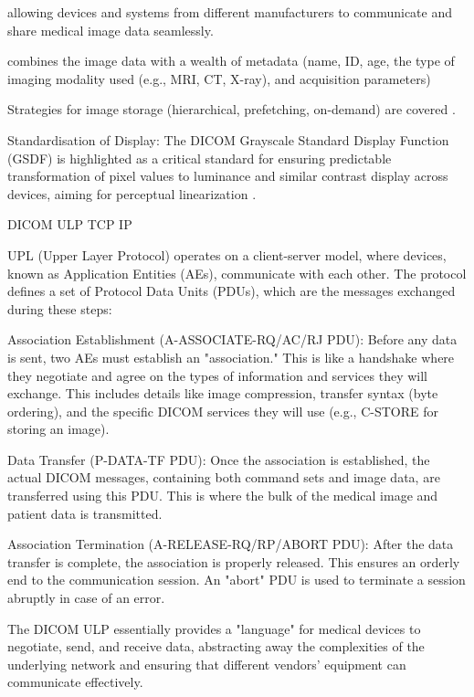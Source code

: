 allowing devices and systems from different manufacturers to communicate and share medical image data seamlessly.

combines the image data with a wealth of metadata (name, ID, age, the type of imaging modality used (e.g., MRI, CT, X-ray), and acquisition parameters)

Strategies for image storage (hierarchical, prefetching, on-demand)
are covered \cite{bushberg2011essential}.

Standardisation of Display: The DICOM Grayscale Standard Display Function (GSDF) is highlighted as a critical standard for ensuring predictable transformation of pixel values to luminance and similar contrast display across devices, aiming for perceptual linearization \cite{bushberg2011essential}.

DICOM ULP
TCP
IP


UPL (Upper Layer Protocol) operates on a client-server model, where devices, known as Application Entities (AEs), communicate with each other. The protocol defines a set of Protocol Data Units (PDUs), which are the messages exchanged during these steps:

    Association Establishment (A-ASSOCIATE-RQ/AC/RJ PDU): Before any data is sent, two AEs must establish an "association." This is like a handshake where they negotiate and agree on the types of information and services they will exchange. This includes details like image compression, transfer syntax (byte ordering), and the specific DICOM services they will use (e.g., C-STORE for storing an image).

Data Transfer (P-DATA-TF PDU): Once the association is established, the actual DICOM messages, containing both command sets and image data, are transferred using this PDU. This is where the bulk of the medical image and patient data is transmitted.

Association Termination (A-RELEASE-RQ/RP/ABORT PDU): After the data transfer is complete, the association is properly released. This ensures an orderly end to the communication session. An "abort" PDU is used to terminate a session abruptly in case of an error.

The DICOM ULP essentially provides a "language" for medical devices to negotiate, send, and receive data, abstracting away the complexities of the underlying network and ensuring that different vendors' equipment can communicate effectively.
